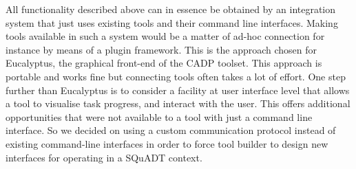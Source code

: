 \documentclass{article}
\newcommand{\squadt}{SQuADT\xspace}
\begin{document}
  

  


  All functionality described above can in essence be obtained by an
  integration system that just uses existing tools and their command line
  interfaces. Making tools available in such a system would be a matter of
  ad-hoc connection for instance by means of a plugin framework. This is the
  approach chosen for Eucalyptus, the graphical front-end of the CADP toolset.
  This approach is portable and works fine but connecting tools often takes a
  lot of effort. One step further than Eucalyptus is to consider a facility at
  user interface level that allows a tool to visualise task progress, and
  interact with the user. This offers additional opportunities that were not
  available to a tool with just a command line interface. So we decided on
  using a custom communication protocol instead of existing command-line
  interfaces in order to force tool builder to design new interfaces for
  operating in a \squadt context.
\end{document}

